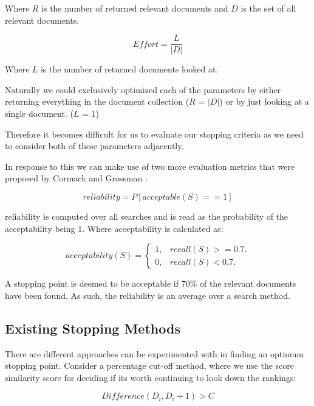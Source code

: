 Where $R$ is the number of returned relevant documents and $D$ is the set of all relevant documents.

\begin{equation}
Effort = \frac{L}{|D|}
\end{equation}

Where $L$ is the number of returned documents looked at.

Naturally we could exclusively optimized each of the parameters by either returning everything in the document collection ($R$ = $|D|$) or by just looking at a single document. ($L$ = 1)

Therefore it becomes difficult for us to evaluate our stopping criteria as we need to consider both of these parameters adjacently.

In response to this we can make use of two more evaluation metrics that were proposed by Cormack and Grossman \cite{Cormack2016}:

\begin{equation}
reliability = P [acceptable(S) == 1]
\end{equation}

reliability is computed over all searches and is read as the probability of the acceptability being 1. Where acceptability is calculated as:

\begin{equation}
  acceptability(S)=\begin{cases}
    1, & \text{$recall(S)>=0.7$}.\\
    0, & \text{$recall(S)<0.7$}.
  \end{cases}
\end{equation}

A stopping point is deemed to be acceptable if 70\% of the relevant documents have been found. As such, the reliability is an average over a search method.


\subsection{Existing Stopping Methods} \label{methods}

There are different approaches can be experimented with in finding an optimum stopping point.  Consider a percentage cut-off method, where we use the score similarity score for deciding if its worth continuing to look down the rankings:

\begin{equation}
	  Difference(D_i, D_i+1) > C
\end{equation}


